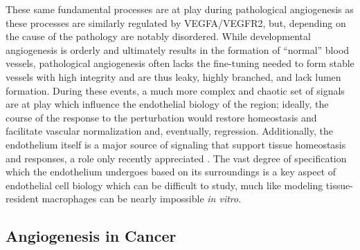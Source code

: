 These same fundamental processes are at play during pathological angiogenesis as these processes are similarly regulated by VEGFA/VEGFR2, but, depending on the cause of the pathology are notably disordered. While developmental angiogenesis is orderly and ultimately results in the formation of ``normal'' blood vessels, pathological angiogenesis often lacks the fine\hyp{}tuning needed to form stable vessels with high integrity and are thus leaky, highly branched, and lack lumen formation. During these events, a much more complex and chaotic set of signals are at play which influence the endothelial biology of the region; ideally, the course of the response to the perturbation would restore homeostasis and facilitate vascular normalization and, eventually, regression. Additionally, the endothelium itself is a major source of signaling that support tissue homeostasis and responses, a role only recently appreciated \citep{Amersfoort2022}. The vast degree of specification which the endothelium undergoes based on its surroundings is a key aspect of endothelial cell biology which can be difficult to study, much like modeling tissue\hyp{}resident macrophages can be nearly impossible \textit{in vitro}.

\subsection{Angiogenesis in Cancer}\label{cancerang}

